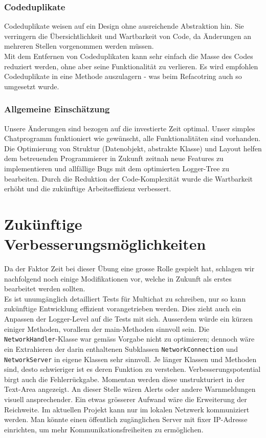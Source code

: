 \documentclass[10pt, hyperref, a4paper]{article}
\begin{document}
\subsubsection{Codeduplikate}
Codeduplikate weisen auf ein Design ohne ausreichende Abstraktion hin. Sie verringern die Übersichtlichkeit und Wartbarkeit von Code, da Änderungen an mehreren Stellen vorgenommen werden müssen.\\
Mit dem Entfernen von Codeduplikaten kann sehr einfach die Masse des Codes reduziert werden, ohne aber seine Funktionalität zu verlieren. Es wird empfohlen Codeduplikate in eine Methode auszulagern \cite{Fowler1999} - was beim Refacotring auch so umgesetzt wurde.

\subsubsection{Allgemeine Einschätzung}
Unsere Änderungen sind bezogen auf die investierte Zeit optimal. Unser simples Chatprogramm funktioniert wie gewünscht, alle Funktionalitäten sind vorhanden. Die Optimierung von Struktur (Datenobjekt, abstrakte Klasse) und Layout helfen dem betreuenden Programmierer in Zukunft zeitnah neue Features zu implementieren und allfällige Bugs mit dem optimierten Logger-Tree zu bearbeiten. Durch die Reduktion der Code-Komplexität wurde die Wartbarkeit erhöht und die zukünftige Arbeitseffizienz verbessert.





\section{Zukünftige Verbesserungsmöglichkeiten} \label{verbesserungen}
Da der Faktor Zeit bei dieser Übung eine grosse Rolle gespielt hat, schlagen wir nachfolgend noch einige Modifikationen vor, welche in Zukunft als erstes bearbeitet werden sollten.\\
Es ist unumgänglich detailliert Tests für Multichat zu schreiben, nur so kann zukünftige Entwicklung effizient vorangetrieben werden. Dies zieht auch ein Anpassen der Logger-Level auf die Tests mit sich. Ausserdem würde ein kürzen einiger Methoden, vorallem der main-Methoden sinnvoll sein. Die \texttt{NetworkHandler}-Klasse war gemäss Vorgabe nicht zu optimieren; dennoch wäre ein Extrahieren der darin enthaltenen Subklassen \texttt{NetworkConnection} und \texttt{NetworkServer} in eigene Klassen sehr sinnvoll. Je länger Klassen und Methoden sind, desto schwieriger ist es deren Funktion zu verstehen. Verbesserungspotential birgt auch die Fehlerrückgabe. Momentan werden diese unstrukturiert in der Text-Area angezeigt. An dieser Stelle wären Alerts oder andere Warnmeldungen visuell ansprechender. Ein etwas grösserer Aufwand wäre die Erweiterung der Reichweite. Im aktuellen Projekt kann nur im lokalen Netzwerk kommuniziert werden. Man könnte einen öffentlich zugänglichen Server mit fixer IP-Adresse einrichten, um mehr Kommunikationsfreiheiten zu ermöglichen. 
\end{document}
